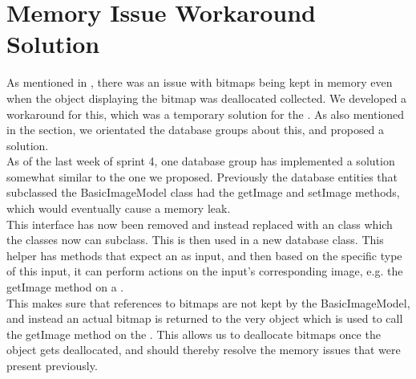 
\section{Memory Issue Workaround Solution}
\label{sec:memory_issue_workaround_solution}

As mentioned in , there was an issue with bitmaps being kept in memory even when the object displaying the bitmap was deallocated collected. We developed a workaround for this, which was a temporary solution for the . As also mentioned in the section, we orientated the database groups about this, and proposed a solution. \\

As of the last week of sprint 4, one database group has implemented a solution somewhat similar to the one we proposed. Previously the database entities that subclassed the BasicImageModel class had the getImage and setImage methods, which would eventually cause a memory leak. \\

This interface has now been removed and instead replaced with an  class which the classes now can subclass. This  is then used in a new  database class. This helper has methods that expect an  as input, and then based on the specific type of this input, it can perform actions on the input's corresponding image, e.g. the getImage method on a . \\

This makes sure that references to bitmaps are not kept by the BasicImageModel, and instead an actual bitmap is returned to the very object which is used to call the getImage method on the . This allows us to deallocate bitmaps once the object gets deallocated, and should thereby resolve the memory issues that were present previously. 